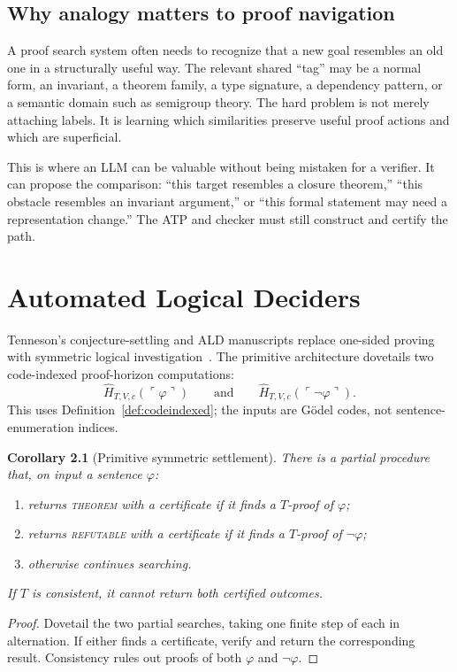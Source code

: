 \documentclass[11pt,oneside]{book}
\newtheorem{corollary}[theorem]{Corollary}
\theoremstyle{definition}
\theoremstyle{remark}
\newcommand{\code}[1]{\ulcorner #1\urcorner}
\begin{document}
\section{Why analogy matters to proof navigation}
A proof search system often needs to recognize that a new goal resembles an old one in a structurally useful way. The relevant shared ``tag'' may be a normal form, an invariant, a theorem family, a type signature, a dependency pattern, or a semantic domain such as semigroup theory. The hard problem is not merely attaching labels. It is learning which similarities preserve useful proof actions and which are superficial.

This is where an LLM can be valuable without being mistaken for a verifier. It can propose the comparison: ``this target resembles a closure theorem,'' ``this obstacle resembles an invariant argument,'' or ``this formal statement may need a representation change.'' The ATP and checker must still construct and certify the path.

\chapter{Automated Logical Deciders}\label{ch:ald}
Tenneson's conjecture-settling and ALD manuscripts replace one-sided proving with symmetric logical investigation~\cite{tennesonConjecture,tennesonALD}. The primitive architecture dovetails two code-indexed proof-horizon computations:
\[
\widehat H_{T,V,c}(\code{\varphi})
\qquad\text{and}\qquad
\widehat H_{T,V,c}(\code{\neg\varphi}).
\]
This uses Definition~\ref{def:codeindexed}; the inputs are G\"odel codes, not sentence-enumeration indices.

\begin{corollary}[Primitive symmetric settlement]\label{cor:settlement}
There is a partial procedure that, on input a sentence $\varphi$:
\begin{enumerate}[label=(\alph*)]
\item returns \textsc{theorem} with a certificate if it finds a $T$-proof of $\varphi$;
\item returns \textsc{refutable} with a certificate if it finds a $T$-proof of $\neg\varphi$;
\item otherwise continues searching.
\end{enumerate}
If $T$ is consistent, it cannot return both certified outcomes.
\end{corollary}
\begin{proof}
Dovetail the two partial searches, taking one finite step of each in alternation. If either finds a certificate, verify and return the corresponding result. Consistency rules out proofs of both $\varphi$ and $\neg\varphi$.
\end{proof}
\end{document}

